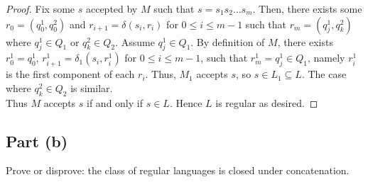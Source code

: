\documentclass{article}
\begin{document}
\begin{proof}
    \noindent
    Fix some $s$ accepted by $M$ such that $s = s_1 s_2 \ldots s_m$. Then, there exists some $r_0 = (q_0^1, q_0^2)$ and $r_{i+1} = \delta(s_i, r_i)$ for 
    $0 \leq i \leq m - 1$ such that $r_m = (q_j^1, q_k^2)$ where $q_j^1 \in Q_1$ or $q_k^2 \in Q_2$. Assume $q_j^1 \in Q_1$. By definition of $M$, there exists 
    $r_0^1 = q_0^1$, $r_{i+1}^1 = \delta_1(s_i, r_i^1)$ for $0 \leq i \leq m - 1$, such that $r_{m}^1 = q_j^1 \in Q_1$, namely $r_i^1$ is the first component of
    each $r_i$. Thus, $M_1$ accepts $s$, so $s \in L_1 \subseteq L$. The case where $q_k^2 \in Q_2$ is similar. \\

    \noindent
    Thus $M$ accepts $s$ if and only if $s \in L$. Hence $L$ is regular as desired.
\end{proof}

\subsection*{Part (b)}

Prove or disprove: the class of regular languages is closed under concatenation.
\end{document}
